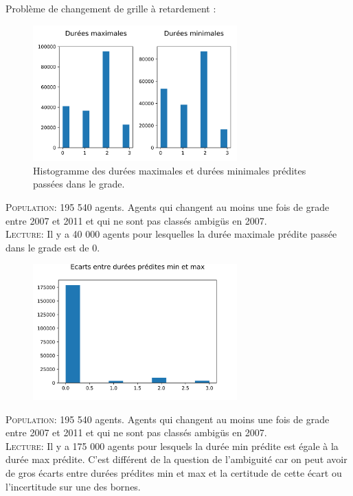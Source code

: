 \documentclass[11pt,a4paper]{article}
\begin{document}
Problème de changement de grille à retardement :
\begin{figure}[H] 
	\caption{Histogramme des durées maximales et durées minimales prédites passées dans le grade.}
	\label{transit1} 
	\includegraphics[width=0.70\textwidth]{histogramme_durees_maximales_minimales_qd_ib_NaN_traite_comme_chgmt_grade.png} 
\end{figure}
\begin{minipage}{15cm}
	\footnotesize
	\textsc{Population:} 195 540 agents. Agents qui changent au moins une fois de grade entre 2007 et 2011 et qui ne sont pas classés ambigüs en 2007.\\
	\textsc{Lecture:} Il y a 40 000 agents pour lesquelles la durée maximale prédite passée dans le grade est de 0.
\end{minipage}

\begin{figure}[H] 
	\caption{}
	\label{transit1} 
	\includegraphics[width=0.70\textwidth]{histogramme_des_ecarts_qd_ib_NaN_traite_comme_chgmt_grade.png} 
\end{figure}
\begin{minipage}{15cm}
	\footnotesize
	\textsc{Population:} 195 540 agents. Agents qui changent au moins une fois de grade entre 2007 et 2011 et qui ne sont pas classés ambigüs en 2007.\\
	\textsc{Lecture:} Il y a 175 000 agents pour lesquels la durée min prédite est égale à la durée max prédite. C'est différent de la question de l'ambiguité car on peut avoir de gros écarts entre durées prédites min et max et la certitude de cette écart ou l'incertitude sur une des bornes.
\end{minipage}
\bigskip
\end{document}
